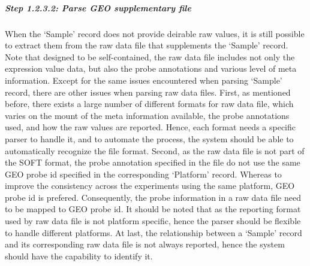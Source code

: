 \subparagraph{\textit{Step 1.2.3.2: Parse GEO supplementary file}}

When the `Sample' record does not provide deirable raw values, it is still
possible to extract them from the raw data file that supplements the `Sample'
record.
%
Note that designed to be self-contained, the raw data file includes not only
the expression value data, but also the probe annotations and various level
of meta information.
%
Except for the same issues encountered when parsing `Sample' record, there
are other issues when parsing raw data files.
First, as mentioned before, there exists a large number of different formats
for raw data file, which varies on the mount of the meta information
available, the probe annotations used, and how the raw values are reported.
%
Hence, each format needs a specific parser to handle it, and to automate the
process, the system should be able to automatically recognize the file format.
Second, as the raw data file is not part of the SOFT format, the probe
annotation specified in the file do not use the same GEO probe id specified in
the corresponding `Platform' record.
%
Whereas to improve the consistency across the experiments using the same
platform, GEO probe id is prefered.
%
Consequently, the probe information in a raw data file need to be mapped to
GEO probe id.
It should be noted that as the reporting format used by raw data file is not
platform specific, hence the parser should be flexible to handle different
platforms.
%
At last, the relationship between a `Sample' record and its corresponding
raw data file is not always reported, hence the system should have the
capability to identify it.


